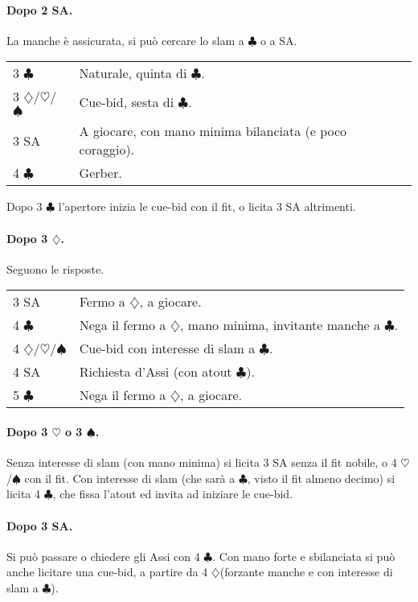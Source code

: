 \documentclass[a4paper,10pt]{article}
\renewcommand{\c}{$\clubsuit$\xspace}
\renewcommand{\d}{$\diamondsuit$\xspace}
\newcommand{\h}{$\heartsuit$\xspace}
\newcommand{\s}{$\spadesuit$\xspace}
\newcommand{\sa}{SA\xspace}
\newcommand{\smallspace}{\vskip0.3cm}
\newenvironment{twocol}
  {\smallspace\noindent\begin{tabular}{l p{0.78\textwidth}}}
  {\end{tabular}\smallspace}
\begin{document}
\paragraph{Dopo 2 \sa.} La manche è assicurata, si può cercare lo slam a \c o a \sa.

\begin{twocol}
	3 \c & Naturale, quinta di \c. \\
	3 \d/\h/\s & Cue-bid, sesta di \c. \\
	3 \sa & A giocare, con mano minima bilanciata (e poco coraggio). \\
	4 \c & Gerber.
\end{twocol}

Dopo 3 \c l'apertore inizia le cue-bid con il fit, o licita 3 \sa altrimenti. %

\paragraph{Dopo 3 \d.} Seguono le risposte.

\begin{twocol}
	3 \sa & Fermo a \d, a giocare. \\
	4 \c & Nega il fermo a \d, mano minima, invitante manche a \c. \\
	4 \d/\h/\s & Cue-bid con interesse di slam a \c. \\
	4 \sa & Richiesta d'Assi (con atout \c). \\
	5 \c & Nega il fermo a \d, a giocare.
\end{twocol}

\paragraph{Dopo 3 \h o 3 \s.} Senza interesse di slam (con mano minima) si licita 3 \sa senza il fit nobile, o 4 \h/\s con il fit. Con interesse di slam (che sarà a \c, visto il fit almeno decimo) si licita 4 \c, che fissa l'atout ed invita ad iniziare le cue-bid.

\paragraph{Dopo 3 \sa.} Si può passare o chiedere gli Assi con 4 \c. Con mano forte e sbilanciata si può anche licitare una cue-bid, a partire da 4 \d (forzante manche e con interesse di slam a \c).
\end{document}
